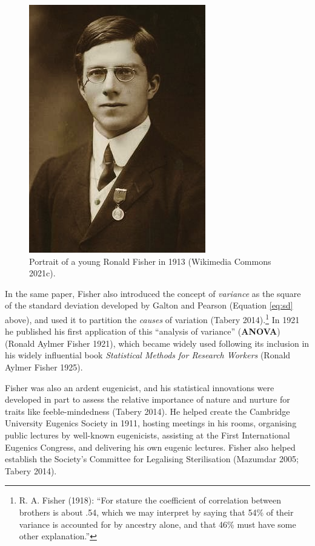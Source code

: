 \documentclass[
]{book}
\begin{document}
\begin{figure}

{\centering \includegraphics[width=0.6\linewidth]{figs/introduction/Youngronaldfisher2} 

}

\caption{Portrait of a young Ronald Fisher in 1913 (Wikimedia Commons 2021c).}\label{fig:fisher}
\end{figure}

In the same paper, Fisher also introduced the concept of \emph{variance} as the square of the standard deviation developed by Galton and Pearson (Equation \eqref{eq:sd} above), and used it to partition the \emph{causes} of variation (Tabery 2014).\footnote{R. A. Fisher (1918): ``For stature the coefficient of correlation between brothers is about .54, which we may interpret by saying that 54\% of their variance is accounted for by ancestry alone, and that 46\% must have some other explanation.''} In 1921 he published his first application of this ``analysis of variance'' (\textbf{ANOVA}) (Ronald Aylmer Fisher 1921), which became widely used following its inclusion in his widely influential book \emph{Statistical Methods for Research Workers} (Ronald Aylmer Fisher 1925).

Fisher was also an ardent eugenicist, and his statistical innovations were developed in part to assess the relative importance of nature and nurture for traits like feeble-mindedness (Tabery 2014). He helped create the Cambridge University Eugenics Society in 1911, hosting meetings in his rooms, organising public lectures by well-known eugenicists, assisting at the First International Eugenics Congress, and delivering his own eugenic lectures. Fisher also helped establish the Society's Committee for Legalising Sterilisation (Mazumdar 2005; Tabery 2014).
\end{document}
